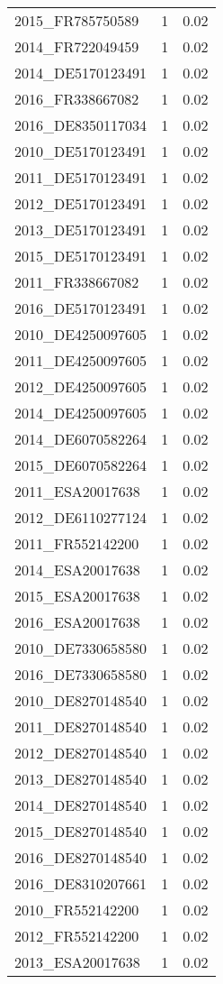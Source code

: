 \begin{table*}[htbp]
\begin{tabular}{lrr}
2015_FR785750589 & 1 & 0.02 \\
2014_FR722049459 & 1 & 0.02 \\
2014_DE5170123491 & 1 & 0.02 \\
2016_FR338667082 & 1 & 0.02 \\
2016_DE8350117034 & 1 & 0.02 \\
2010_DE5170123491 & 1 & 0.02 \\
2011_DE5170123491 & 1 & 0.02 \\
2012_DE5170123491 & 1 & 0.02 \\
2013_DE5170123491 & 1 & 0.02 \\
2015_DE5170123491 & 1 & 0.02 \\
2011_FR338667082 & 1 & 0.02 \\
2016_DE5170123491 & 1 & 0.02 \\
2010_DE4250097605 & 1 & 0.02 \\
2011_DE4250097605 & 1 & 0.02 \\
2012_DE4250097605 & 1 & 0.02 \\
2014_DE4250097605 & 1 & 0.02 \\
2014_DE6070582264 & 1 & 0.02 \\
2015_DE6070582264 & 1 & 0.02 \\
2011_ESA20017638 & 1 & 0.02 \\
2012_DE6110277124 & 1 & 0.02 \\
2011_FR552142200 & 1 & 0.02 \\
2014_ESA20017638 & 1 & 0.02 \\
2015_ESA20017638 & 1 & 0.02 \\
2016_ESA20017638 & 1 & 0.02 \\
2010_DE7330658580 & 1 & 0.02 \\
2016_DE7330658580 & 1 & 0.02 \\
2010_DE8270148540 & 1 & 0.02 \\
2011_DE8270148540 & 1 & 0.02 \\
2012_DE8270148540 & 1 & 0.02 \\
2013_DE8270148540 & 1 & 0.02 \\
2014_DE8270148540 & 1 & 0.02 \\
2015_DE8270148540 & 1 & 0.02 \\
2016_DE8270148540 & 1 & 0.02 \\
2016_DE8310207661 & 1 & 0.02 \\
2010_FR552142200 & 1 & 0.02 \\
2012_FR552142200 & 1 & 0.02 \\
2013_ESA20017638 & 1 & 0.02 \\

\end{tabular}
\end{table*}
